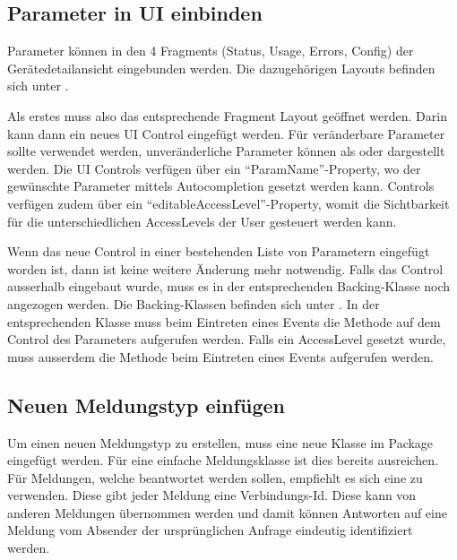 \subsection{Parameter in UI einbinden}
\label{sub:parameter_einbinden}
Parameter können in den 4 Fragments (Status, Usage, Errors, Config) der Gerätedetailansicht eingebunden werden. Die dazugehörigen Layouts befinden sich unter .

Als erstes muss also das entsprechende Fragment Layout geöffnet werden. Darin kann dann ein neues UI Control eingefügt werden. Für veränderbare Parameter sollte  verwendet werden, unveränderliche Parameter können als  oder  dargestellt werden. Die UI Controls verfügen über ein \enquote{ParamName}-Property, wo der gewünschte Parameter mittels Autocompletion gesetzt werden kann.  Controls verfügen zudem über ein \enquote{editableAccessLevel}-Property, womit die Sichtbarkeit für die unterschiedlichen AccessLevels der User gesteuert werden kann.

Wenn das neue Control in einer bestehenden Liste von Parametern eingefügt worden ist, dann ist keine weitere Änderung mehr notwendig. Falls das Control ausserhalb eingebaut wurde, muss es in der entsprechenden Backing-Klasse noch angezogen werden. Die Backing-Klassen befinden sich unter . In der entsprechenden Klasse muss beim Eintreten eines  Events die Methode  auf dem Control des Parameters aufgerufen werden. Falls ein AccessLevel gesetzt wurde, muss ausserdem die Methode  beim Eintreten eines  Events aufgerufen werden.

\subsection{Neuen Meldungstyp einfügen}
Um einen neuen Meldungstyp zu erstellen, muss eine neue Klasse im Package \code{} eingefügt werden. Für eine einfache Meldungsklasse ist dies bereits ausreichen. Für Meldungen, welche beantwortet werden sollen, empfiehlt es sich eine  zu verwenden. Diese gibt jeder Meldung eine Verbindungs-Id. Diese kann von anderen Meldungen übernommen werden und damit können Antworten auf eine Meldung vom Absender der ursprünglichen Anfrage eindeutig identifiziert werden.


